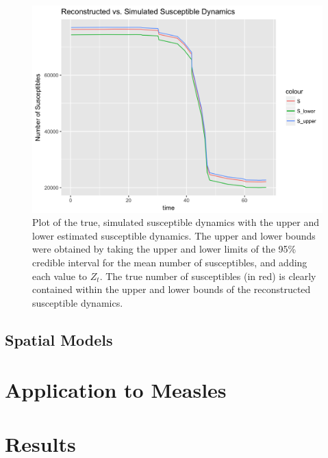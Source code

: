 \documentclass{article}
\begin{document}
\begin{figure}[htbp]
\includegraphics[scale=.25, center]{SRplot.png}
\caption{Plot of the true, simulated susceptible dynamics with the upper and lower estimated susceptible dynamics. The upper and lower bounds were obtained by taking the upper and lower limits of the 95\% credible interval for the mean number of susceptibles, and adding each value to $Z_{t}$. The true number of susceptibles (in red) is clearly contained within the upper and lower bounds of the reconstructed susceptible dynamics.}
\label{fig:SR}
\end{figure}


\subsection{Spatial Models}

\section{Application to Measles}

\section{Results}
\end{document}
